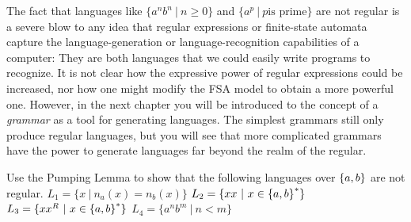\smallskip

The fact that languages like $\{a^nb^n\ | \ n \geq 0\}$ and $\{a^p \ |\ p \mbox{
is prime}\}$ are not regular is a severe blow to any idea that regular
expressions or finite-state automata capture the language-generation or
language-recognition capabilities of a computer: They are both languages that 
we could easily write programs to recognize.  It is not clear how the expressive
power of regular expressions could be increased, nor how one might modify the
FSA model to obtain a more powerful one.  However, 
in the next chapter you will be
introduced to the concept of a {\em grammar} as a tool for generating languages. 
The simplest grammars still only produce regular languages, but you will see
that more complicated grammars have the power to generate languages far beyond
the realm of the regular.

\begin{exercises}
\problem Use the Pumping Lemma to show that the following languages over $\mbox{$\{a,b\}$}$ 
are not regular.
\ppart $L_1 = \{ x \ | \ n_a(x) = n_b(x)\}$
\ppart $L_2 = \{ xx \ | \ x \in \mbox{$\{a,b\}$}^*\}$
\ppart $L_3 = \{ xx^R \ | \ x \in \mbox{$\{a,b\}$}^*\}$
\ppart $L_4 = \{ a^nb^m \ | \ n < m \}$

\end{exercises}



